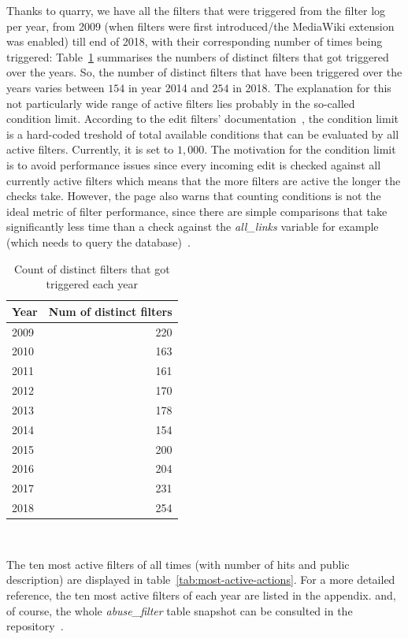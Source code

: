 Thanks to quarry, we have all the filters that were triggered from the filter log per year, from 2009 (when filters were first introduced/the MediaWiki extension was enabled) till end of 2018, with their corresponding number of times being triggered:
Table~\ref{tab:active-filters-count} summarises the numbers of distinct filters that got triggered over the years.
So, the number of distinct filters that have been triggered over the years varies between $154$ in year 2014 and $254$ in 2018.
The explanation for this not particularly wide range of active filters lies probably in the so-called condition limit.
According to the edit filters' documentation~\cite{Wikipedia:EditFilterDocumentation}, the condition limit is a hard-coded treshold of total available conditions that can be evaluated by all active filters.
Currently, it is set to $1,000$.
The motivation for the condition limit is to avoid performance issues since every incoming edit is checked against all currently active filters which means that the more filters are active the longer the checks take.
However, the page also warns that counting conditions is not the ideal metric of filter performance, since there are simple comparisons that take significantly less time than a check against the \emph{all\_links} variable for example (which needs to query the database)~\cite{Wikipedia:EditFilterDocumentation}.

\begin{table}
  \centering
  \begin{tabular}{l r }
    Year & Num of distinct filters \\
    \hline
    2009 & 220 \\
    2010 & 163 \\
    2011 & 161 \\
    2012 & 170 \\
    2013 & 178 \\
    2014 & 154 \\
    2015 & 200 \\
    2016 & 204 \\
    2017 & 231 \\
    2018 & 254 \\
  \end{tabular}
  \caption{Count of distinct filters that got triggered each year}~\label{tab:active-filters-count}
\end{table}

The ten most active filters of all times (with number of hits and public description) are displayed in table~\ref{tab:most-active-actions}.
For a more detailed reference, the ten most active filters of each year are listed in the appendix. %
and, of course, the whole \emph{abuse\_filter} table snapshot can be consulted in the repository~\cite{github}.

